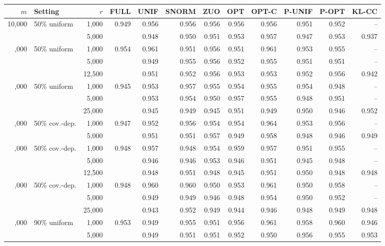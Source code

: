 \begin{tabular}{rlrrrrrrrrrr}
\toprule
\(m\) & Setting & \(r\) & FULL & UNIF & SNORM & ZUO & OPT & OPT-C & P-UNIF & P-OPT & KL-CC\\
\midrule
10,000 & 50\% uniform & 1,000 & 0.949 & 0.956 & 0.956 & 0.956 & 0.956 & 0.956 & 0.951 & 0.952 & --\\
 &  & 5,000 &  & 0.948 & 0.950 & 0.951 & 0.953 & 0.957 & 0.947 & 0.953 & 0.937\\
\addlinespace
25,000 & 50\% uniform & 1,000 & 0.954 & 0.961 & 0.951 & 0.956 & 0.951 & 0.961 & 0.953 & 0.955 & --\\
 &  & 5,000 &  & 0.949 & 0.955 & 0.956 & 0.952 & 0.955 & 0.951 & 0.951 & --\\
 &  & 12,500 &  & 0.951 & 0.952 & 0.956 & 0.953 & 0.953 & 0.952 & 0.956 & 0.942\\
\addlinespace
50,000 & 50\% uniform & 1,000 & 0.945 & 0.953 & 0.957 & 0.955 & 0.954 & 0.955 & 0.954 & 0.948 & --\\
 &  & 5,000 &  & 0.953 & 0.954 & 0.950 & 0.957 & 0.955 & 0.948 & 0.951 & --\\
 &  & 25,000 &  & 0.945 & 0.949 & 0.945 & 0.951 & 0.949 & 0.950 & 0.946 & 0.952\\
\addlinespace
10,000 & 50\% cov.-dep. & 1,000 & 0.947 & 0.952 & 0.956 & 0.954 & 0.954 & 0.964 & 0.953 & 0.956 & --\\
 &  & 5,000 &  & 0.951 & 0.951 & 0.957 & 0.949 & 0.958 & 0.948 & 0.946 & 0.949\\
\addlinespace
25,000 & 50\% cov.-dep. & 1,000 & 0.948 & 0.957 & 0.948 & 0.954 & 0.959 & 0.957 & 0.951 & 0.955 & --\\
 &  & 5,000 &  & 0.946 & 0.946 & 0.953 & 0.946 & 0.951 & 0.945 & 0.948 & --\\
 &  & 12,500 &  & 0.948 & 0.951 & 0.948 & 0.945 & 0.951 & 0.950 & 0.948 & 0.948\\
\addlinespace
50,000 & 50\% cov.-dep. & 1,000 & 0.948 & 0.960 & 0.960 & 0.950 & 0.953 & 0.961 & 0.950 & 0.958 & --\\
 &  & 5,000 &  & 0.949 & 0.949 & 0.946 & 0.948 & 0.954 & 0.950 & 0.952 & --\\
 &  & 25,000 &  & 0.943 & 0.952 & 0.949 & 0.944 & 0.946 & 0.948 & 0.949 & 0.948\\
\addlinespace
10,000 & 90\% uniform & 1,000 & 0.953 & 0.949 & 0.955 & 0.951 & 0.956 & 0.961 & 0.958 & 0.960 & 0.946\\
 &  & 5,000 &  & 0.949 & 0.951 & 0.951 & 0.952 & 0.950 & 0.956 & 0.955 & 0.953\\

\end{tabular}
